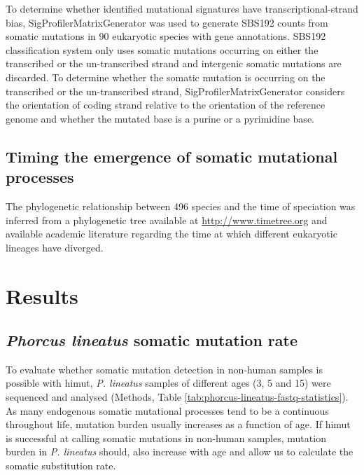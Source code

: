To determine whether identified mutational signatures have transcriptional-strand bias, SigProfilerMatrixGenerator \cite{Bergstrom2019-mz} was used to generate SBS192 counts from somatic mutations in 90 eukaryotic species with gene annotations. SBS192 classification system only uses somatic mutations occurring on either the transcribed or the un-transcribed strand and intergenic somatic mutations are discarded. To determine whether the somatic mutation is occurring on the transcribed or the un-transcribed strand, SigProfilerMatrixGenerator considers the orientation of coding strand relative to the orientation of the reference genome and whether the mutated base is a purine or a pyrimidine base.

\subsection{Timing the emergence of somatic mutational processes}

The phylogenetic relationship between 496 species and the time of speciation was inferred from a phylogenetic tree available at \url{http://www.timetree.org} \cite{timetree} and available academic literature regarding the time at which different eukaryotic lineages have diverged. 

\section{Results}

\subsection{\textit{Phorcus lineatus} somatic mutation rate}

To evaluate whether somatic mutation detection in non-human samples is possible with himut, \textit{P. lineatus} samples of different ages (3, 5 and 15) were sequenced and analysed (Methods, Table \ref{tab:phorcus-lineatus-fastq-statistics}). As many endogenous somatic mutational processes tend to be a continuous throughout life, mutation burden usually increases as a function of age. If himut is successful at calling somatic mutations in non-human samples, mutation burden in \textit{P. lineatus} should, also increase with age and allow us to calculate the somatic substitution rate. 

